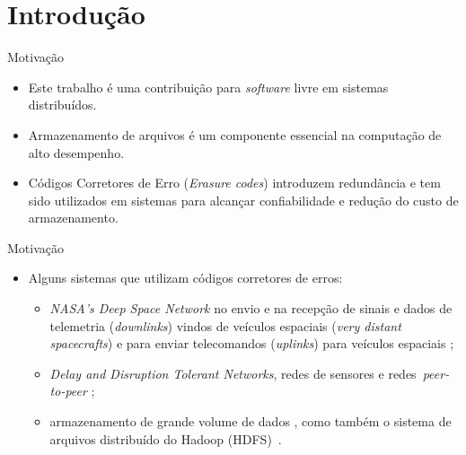  \section{Introdução}

  \begin{frame}{Motivação}
     \begin{itemize}
      \item Este trabalho é uma contribuição para \emph{software} livre em sistemas distribuídos.
      \item Armazenamento de arquivos é um componente essencial na computação de alto desempenho. 
      \item Códigos Corretores de Erro (\emph{Erasure codes}) introduzem redundância e tem sido utilizados em sistemas para alcançar confiabilidade e redução do custo de armazenamento.    
     \end{itemize}
  \end{frame}

  \begin{frame}{Motivação}
     \begin{itemize}
      \item Alguns sistemas que utilizam códigos corretores de erros:
	\begin{itemize}
            \item \emph{NASA's Deep Space Network} no envio e na recepção de sinais e dados de telemetria
(\emph{downlinks}) vindos de veículos espaciais (\emph{very distant spacecrafts}) e para enviar telecomandos (\emph{uplinks}) para
veículos espaciais \cite{Abrantes:2010, Almeida:2007, STO:2010, TDD:2010};
           \item \emph{Delay and Disruption Tolerant Networks}, redes de sensores e redes~\emph{peer-to-peer} \cite{Bhagwan:2004, Alencar:2004, Haeberlen:2005, Houri:2009,RTAD:2007, Rodrigues:2005, Wilcox-O'Hearn:2008};
           \item armazenamento de grande volume de dados \cite{Anderson:1998,Kubiatowicz:2000,  Saito:2004, Schmuck:2002, Storer:2008,
Storer:2009, Xia:2006}, como também o sistema de arquivos distribuído do Hadoop (HDFS)~\cite{HDFS-503:2010}.
	\end{itemize}
     \end{itemize}
  \end{frame}

